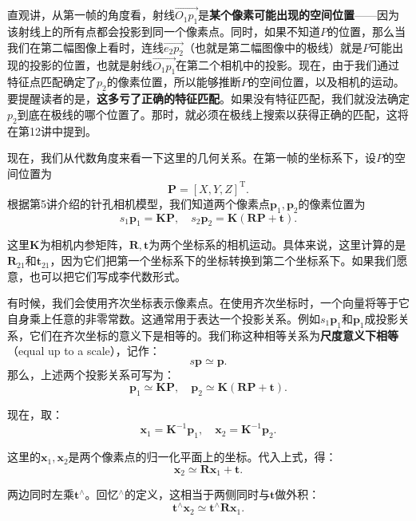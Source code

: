 直观讲，从第一帧的角度看，射线$\overrightarrow{O_1 p_1}$是\textbf{某个像素可能出现的空间位置}——因为该射线上的所有点都会投影到同一个像素点。同时，如果不知道$P$的位置，那么当我们在第二幅图像上看时，连线$\overrightarrow{e_2 p_2}$（也就是第二幅图像中的极线）就是$P$可能出现的投影的位置，也就是射线$\overrightarrow{O_1 p_1}$在第二个相机中的投影。现在，由于我们通过特征点匹配确定了$p_2$的像素位置，所以能够推断$P$的空间位置，以及相机的运动。要提醒读者的是，\textbf{这多亏了正确的特征匹配}。如果没有特征匹配，我们就没法确定$p_2$到底在极线的哪个位置了。那时，就必须在极线上搜索以获得正确的匹配，这将在第12讲中提到。

现在，我们从代数角度来看一下这里的几何关系。在第一帧的坐标系下，设$P$的空间位置为
\[
\bm{P}=[X,Y,Z]^\mathrm{T}.
\]
根据第5讲介绍的针孔相机模型，我们知道两个像素点$\bm{p}_1,\bm{p}_2$的像素位置为
\begin{equation}
s_1 {\bm{p}_1} = \bm{KP},\quad s_2 \bm{p}_2 = \bm{K}\left( \bm{RP + t} \right).
\end{equation}

这里$\bm{K}$为相机内参矩阵，$\bm{R}, \bm{t}$为两个坐标系的相机运动。具体来说，这里计算的是$\bm{R}_{21}$和$\bm{t}_{21}$，因为它们把第一个坐标系下的坐标转换到第二个坐标系下。如果我们愿意，也可以把它们写成李代数形式。

有时候，我们会使用齐次坐标表示像素点。在使用齐次坐标时，一个向量将等于它自身乘上任意的非零常数。这通常用于表达一个投影关系。例如$s_1 \bm{p}_1$和$\bm{p}_1$成投影关系，它们在齐次坐标的意义下是相等的。我们称这种相等关系为\textbf{尺度意义下相等}（equal up to a scale），记作：
\begin{equation}
s\bm{p} \simeq \bm{p}.
\end{equation}
那么，上述两个投影关系可写为：
\begin{equation}
 {\bm{p}_1} \simeq \bm{KP},\quad \bm{p}_2 \simeq \bm{K}\left( \bm{RP + t} \right).
\end{equation}

现在，取：
\begin{equation}
{\bm{x}_1} = {\bm{K}^{ - 1}}{\bm{p}_1}, \quad {\bm{x}_2} = {\bm{K}^{ - 1}}{\bm{p}_2}.
\end{equation}

这里的$\bm{x}_1, \bm{x}_2$是两个像素点的归一化平面上的坐标。代入上式，得：
\begin{equation}
{\bm{x}_2} \simeq \bm{R} {\bm{x}_1} + \bm{t}.
\end{equation}

两边同时左乘$\bm{t}^\wedge$。回忆$^\wedge$的定义，这相当于两侧同时与$\bm{t}$做外积：
\begin{equation}
\bm{t}^\wedge \bm{x}_2 \simeq \bm{t}^\wedge \bm{R} \bm{x}_1.
\end{equation}

